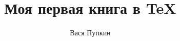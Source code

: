 
\thispagestyle{empty}			

\title{Моя первая книга в \TeX{}}
\author{Вася Пупкин}
\maketitle

\tableofcontents

\newpage

\listoffigures

\listoftables

